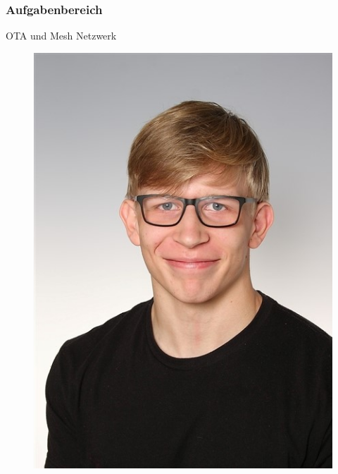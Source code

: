 \subsubsection*{Aufgabenbereich}
OTA und Mesh Netzwerk
\begin{figure}[H]
	\includegraphics[scale=1]{images/stefan_waldl.jpg}
\end{figure}
